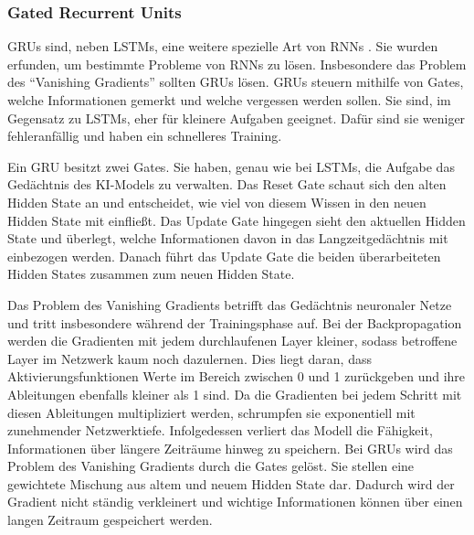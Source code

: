 \subsubsection{Gated Recurrent Units}
GRUs sind, neben LSTMs, eine weitere spezielle Art von RNNs \cite{chung2014empirical}.
Sie wurden erfunden, um bestimmte Probleme von RNNs zu lösen.
Insbesondere das Problem des \enquote{Vanishing Gradients} sollten GRUs lösen.
GRUs steuern mithilfe von Gates, welche Informationen gemerkt und welche vergessen werden sollen.
Sie sind, im Gegensatz zu LSTMs, eher für kleinere Aufgaben geeignet.
Dafür sind sie weniger fehleranfällig und haben ein schnelleres Training.

Ein GRU besitzt zwei Gates.
Sie haben, genau wie bei LSTMs, die Aufgabe das Gedächtnis des KI-Models zu verwalten.
Das Reset Gate schaut sich den alten Hidden State an und entscheidet,
wie viel von diesem Wissen in den neuen Hidden State mit einfließt.
Das Update Gate hingegen sieht den aktuellen Hidden State und überlegt,
welche Informationen davon in das Langzeitgedächtnis mit einbezogen werden.
Danach führt das Update Gate die beiden überarbeiteten Hidden States zusammen zum neuen Hidden State.

Das Problem des Vanishing Gradients betrifft das Gedächtnis neuronaler Netze und tritt insbesondere während der Trainingsphase auf.
Bei der Backpropagation werden die Gradienten mit jedem durchlaufenen Layer kleiner, sodass betroffene Layer im Netzwerk kaum noch dazulernen.
Dies liegt daran, dass Aktivierungsfunktionen Werte im Bereich zwischen 0 und 1 zurückgeben und ihre Ableitungen ebenfalls kleiner als 1 sind.
Da die Gradienten bei jedem Schritt mit diesen Ableitungen multipliziert werden, schrumpfen sie exponentiell mit zunehmender Netzwerktiefe.
Infolgedessen verliert das Modell die Fähigkeit, Informationen über längere Zeiträume hinweg zu speichern.
Bei GRUs wird das Problem des Vanishing Gradients durch die Gates gelöst.
Sie stellen eine gewichtete Mischung aus altem und neuem Hidden State dar.
Dadurch wird der Gradient nicht ständig verkleinert
und wichtige Informationen können über einen langen Zeitraum gespeichert werden.

